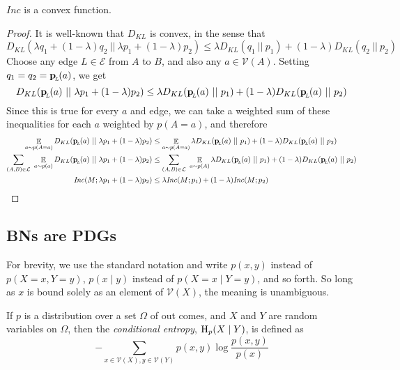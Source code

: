 \documentclass{article}
\newcommand{\bp}[1][L]{\mat{p}_{\!_{#1}\!}}
\newcommand{\V}{\mathcal V}
\newcommand{\Ed}{\mathcal E}
\newcommand\inconsist{\mathit{Inc}}
\numberwithin{equation}{section}
\begin{document}
	
	\begin{lemma}%
		$\inconsist$ is a convex function. %
	\end{lemma}
	\begin{proof}
		It is well-known that $D_{KL}$ is convex, in the sense that 
		\[ D_{KL}(\lambda q_1 + (1-\lambda) q_2 \ ||\ \lambda p_1 + (1-\lambda) p_2) \leq \lambda D_{KL} (q_1\ ||\ p_1) + (1-\lambda) D_{KL}(q_2\ ||\ p_2) \]
		Choose any edge $L \in \Ed$ from $A$ to $B$, and also any $a \in \mathcal V(A)$. 
		Setting $q_1 = q_2 = \bp(a)$, we get
		\[ D_{KL}(\bp(a) \ ||\ \lambda p_1 + (1-\lambda) p_2) \leq \lambda D_{KL} (\bp(a) \ ||\ p_1) + (1-\lambda) D_{KL}(\bp(a)\ ||\ p_2) \]
		Since this is true for every $a$ and edge, we can take a weighted sum of these inequalities for each $a$ weighted by $p(A=a)$, and therefore
		\begin{align*}
			\E_{a\sim p(A=a)} D_{KL}(\bp(a) \ ||\ \lambda p_1 + (1-\lambda) p_2) &\leq \E_{a\sim p(A=a)}\lambda D_{KL} (\bp(a) \ ||\ p_1) + (1-\lambda) D_{KL}(\bp(a)\ ||\ p_2) \\
			\sum_{(A, B) \in \cal L}~\E_{a\sim p(a)} D_{KL}(\bp(a) \ ||\ \lambda p_1 + (1-\lambda) p_2) &\leq \sum_{(A, B) \in \cal L}~\E_{a\sim p(A)}\lambda D_{KL} (\bp(a) \ ||\ p_1) + (1-\lambda) D_{KL}(\bp(a)\ ||\ p_2) \\
			\inconsist(M ; \lambda p_1 + (1-\lambda)p_2) &\leq \lambda \inconsist(M;p_1) + (1-\lambda) \inconsist(M;p_2)
		\end{align*}
	\end{proof}

\subsection*{BNs are PDGs}

For brevity, we use the standard notation and write $p(x, y)$ instead of $p(X \!=\! x, Y \!=\! y)$, $p(x \mid y)$ instead of $p(X \!=\! x\mid Y \!=\! y)$, and so forth. So long as $x$ is bound solely as an element of $\V(X)$, the meaning is unambiguous. 


\begin{defn}
	If $p$ is a distribution over a set $\Omega$ of out comes, and $X$ and $Y$ are random variables on $\Omega$, then the \emph{conditional entropy}, $\mathrm{H}_p(X \mid Y)$, is defined as 
	\[ - \sum_{x \in \V(X), y \in \V(Y)} p(x,y) \log \frac{p(x,y)}{p(x)} \]
\end{defn}
\end{document}
